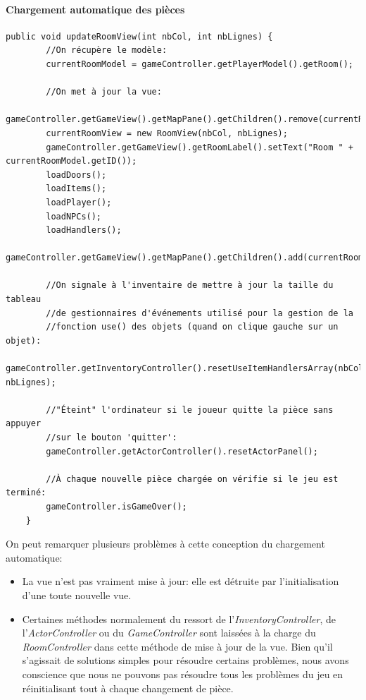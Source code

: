 \documentclass[./standalone.tex]{subfiles}
\begin{document}
\paragraph{Chargement automatique des pièces\\}
\noindent
\begin{lstlisting}[style=Java, caption={Méthode de mise à jour de la vue des pièces extraite du \textit{RoomController}}]
    public void updateRoomView(int nbCol, int nbLignes) {
        //On récupère le modèle:
        currentRoomModel = gameController.getPlayerModel().getRoom();

        //On met à jour la vue:
        gameController.getGameView().getMapPane().getChildren().remove(currentRoomView);
        currentRoomView = new RoomView(nbCol, nbLignes);
        gameController.getGameView().getRoomLabel().setText("Room " + currentRoomModel.getID());
        loadDoors();
        loadItems();
        loadPlayer();
        loadNPCs();
        loadHandlers();
        gameController.getGameView().getMapPane().getChildren().add(currentRoomView);

        //On signale à l'inventaire de mettre à jour la taille du tableau 
        //de gestionnaires d'événements utilisé pour la gestion de la
        //fonction use() des objets (quand on clique gauche sur un objet):
        gameController.getInventoryController().resetUseItemHandlersArray(nbCol, nbLignes);

        //"Éteint" l'ordinateur si le joueur quitte la pièce sans appuyer 
        //sur le bouton 'quitter':
        gameController.getActorController().resetActorPanel();

        //À chaque nouvelle pièce chargée on vérifie si le jeu est terminé:
        gameController.isGameOver();
    }
\end{lstlisting}
\newpage
On peut remarquer plusieurs problèmes à cette conception du chargement automatique:

\begin{itemize}
	\item La vue n'est pas vraiment mise à jour: elle est détruite par l'initialisation d'une toute nouvelle vue.
	\item Certaines méthodes normalement du ressort de l'\textit{InventoryController}, de l'\textit{ActorController} ou du \textit{GameController} sont laissées à la charge du \textit{RoomController} dans cette méthode de mise à jour de la vue. Bien qu'il s'agissait de solutions simples pour résoudre certains problèmes, nous avons conscience que nous ne pouvons pas résoudre tous les problèmes du jeu en réinitialisant tout à chaque changement de pièce.
\end{itemize}
\end{document}
